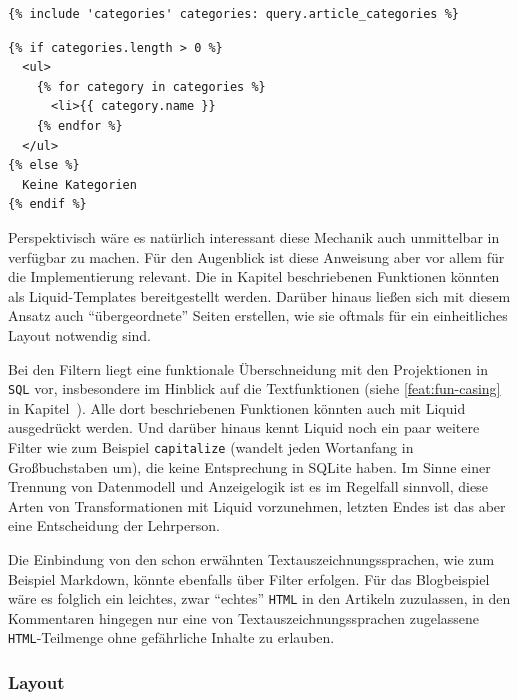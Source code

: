 \begin{lstlisting}[float=h, caption={Verwendung der Liquid-Anweisung \texttt{include}}, label={lst:liquid-include-caller}]
{% include 'categories' categories: query.article_categories %}
\end{lstlisting}

\begin{lstlisting}[float=h, caption={\texttt{categories.liquid}, Template für die Liquid-Anweisung \texttt{include}}, label={lst:liquid-include-template}]
{% if categories.length > 0 %}
  <ul>
    {% for category in categories %}
      <li>{{ category.name }}
    {% endfor %}
  </ul>
{% else %}
  Keine Kategorien
{% endif %}
\end{lstlisting}

Perspektivisch wäre es natürlich interessant diese Mechanik auch unmittelbar in \idename{} verfügbar zu machen. Für den Augenblick ist diese Anweisung aber vor allem für die Implementierung relevant. Die in Kapitel  beschriebenen Funktionen könnten als Liquid-Templates bereitgestellt werden. Darüber hinaus ließen sich mit diesem Ansatz auch "`übergeordnete"' Seiten erstellen, wie sie oftmals für ein einheitliches Layout notwendig sind.

Bei den Filtern liegt eine funktionale Überschneidung mit den Projektionen in \texttt{SQL} vor, insbesondere im Hinblick auf die Textfunktionen (siehe \ref{feat:fun-casing} in Kapitel~). Alle dort beschriebenen Funktionen könnten auch mit Liquid ausgedrückt werden. Und darüber hinaus kennt Liquid noch ein paar weitere Filter wie zum Beispiel \texttt{capitalize} (wandelt jeden Wortanfang in Großbuchstaben um), die keine Entsprechung in SQLite haben. Im Sinne einer Trennung von Datenmodell und Anzeigelogik ist es im Regelfall sinnvoll, diese Arten von Transformationen mit Liquid vorzunehmen, letzten Endes ist das aber eine Entscheidung der Lehrperson.

Die Einbindung von den schon erwähnten Textauszeichnungssprachen, wie zum Beispiel Markdown, könnte ebenfalls über Filter erfolgen. Für das Blogbeispiel wäre es folglich ein leichtes, zwar "`echtes"' \texttt{HTML} in den Artikeln zuzulassen, in den Kommentaren hingegen nur eine von Textauszeichnungssprachen zugelassene \texttt{HTML}-Teilmenge ohne gefährliche Inhalte zu erlauben.

\subsubsection{Layout}

